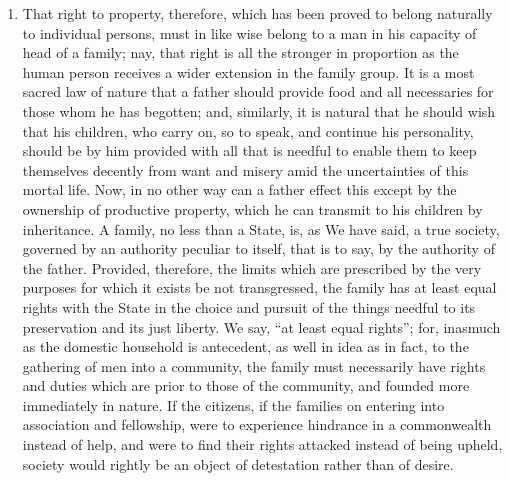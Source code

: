 \documentclass{book}
\begin{document}
\begin{enumerate}
	\item That right to property, therefore, which has been proved to belong naturally to individual persons, must in like wise belong to a man in his capacity of head of a family; nay, that right is all the stronger in proportion as the human person receives a wider extension in the family group. It is a most sacred law of nature that a father should provide food and all necessaries for those whom he has begotten; and, similarly, it is natural that he should wish that his children, who carry on, so to speak, and continue his personality, should be by him provided with all that is needful to enable them to keep themselves decently from want and misery amid the uncertainties of this mortal life. Now, in no other way can a father effect this except by the ownership of productive property, which he can transmit to his children by inheritance. A family, no less than a State, is, as We have said, a true society, governed by an authority peculiar to itself, that is to say, by the authority of the father. Provided, therefore, the limits which are prescribed by the very purposes for which it exists be not transgressed, the family has at least equal rights with the State in the choice and pursuit of the things needful to its preservation and its just liberty. We say, “at least equal rights”; for, inasmuch as the domestic household is antecedent, as well in idea as in fact, to the gathering of men into a community, the family must necessarily have rights and duties which are prior to those of the community, and founded more immediately in nature. If the citizens, if the families on entering into association and fellowship, were to experience hindrance in a commonwealth instead of help, and were to find their rights attacked instead of being upheld, society would rightly be an object of detestation rather than of desire.



\end{enumerate}
\end{document}
